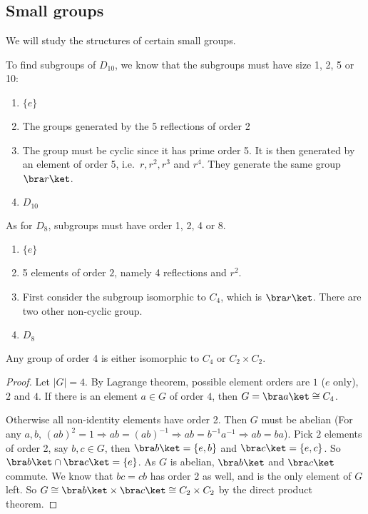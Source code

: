\documentclass[a4paper]{article}
\begin{document}
\subsection{Small groups}
We will study the structures of certain small groups.
\begin{eg}
  To find subgroups of $D_{10}$, we know that the subgroups must have size 1, 2, 5 or 10:
  \begin{enumerate}[label=\arabic{*}:]
    \item $\{e\}$
    \item The groups generated by the 5 reflections of order 2
      \setcounter{enumi}{4}
    \item The group must be cyclic since it has prime order 5. It is then generated by an element of order 5, i.e.\ $r, r^2, r^3$ and $r^4$. They generate the same group $\bra r\ket$.
      \setcounter{enumi}{9}
    \item $D_{10}$
  \end{enumerate}

  As for $D_8$, subgroups must have order 1, 2, 4 or 8.
  \begin{enumerate}[label=\arabic{*}:]
    \item $\{e\}$
    \item 5 elements of order $2$, namely 4 reflections and $r^2$.
      \setcounter{enumi}{3}
    \item First consider the subgroup isomorphic to $C_4$, which is $\bra r\ket$. There are two other non-cyclic group.
      \setcounter{enumi}{7}
    \item $D_8$
  \end{enumerate}
\end{eg}

\begin{prop}
  Any group of order 4 is either isomorphic to $C_4$ or $C_2\times C_2$.
\end{prop}

\begin{proof}
  Let $|G| = 4$. By Lagrange theorem, possible element orders are $1$ ($e$ only), $2$ and $4$. If there is an element $a\in G$ of order $4$, then $G = \bra a\ket \cong C_4$.

  Otherwise all non-identity elements have order 2. Then $G$ must be abelian (For any $a, b$, $(ab)^2 = 1 \Rightarrow ab = (ab)^{-1} \Rightarrow ab = b^{-1}a^{-1} \Rightarrow ab = ba$).
  Pick $2$ elements of order 2, say $b, c\in G$, then $\bra b\ket=\{e, b\}$ and $\bra c\ket = \{e, c\}$. So $\bra b\ket\cap \bra c\ket = \{e\}$. As $G$ is abelian, $\bra b\ket$ and $\bra c\ket$ commute. We know that $bc = cb$ has order 2 as well, and is the only element of $G$ left. So $G \cong \bra b\ket\times \bra c\ket \cong C_2\times C_2$ by the direct product theorem.
\end{proof}
\end{document}
